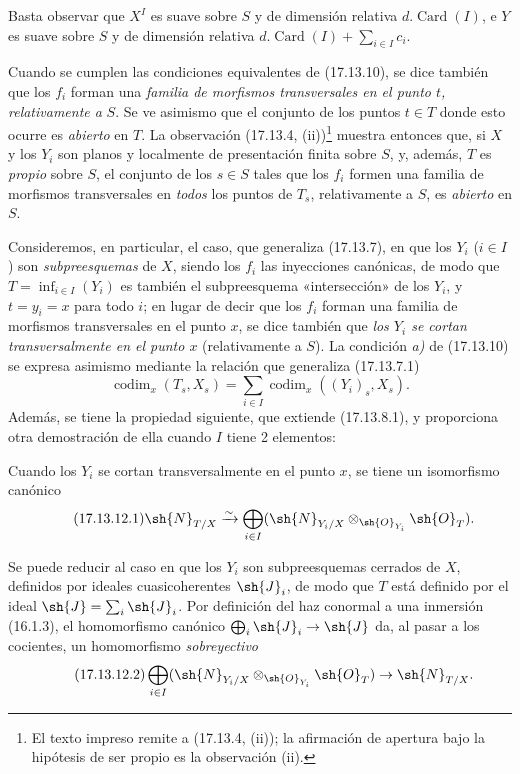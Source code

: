 Basta observar que $X^I$ es suave sobre $S$ y de dimensión relativa $d.\operatorname{Card}(I)$, e $Y$ es suave sobre $S$ y de dimensión relativa $d.\operatorname{Card}(I)+\sum_{i\in I}c_i$.

Cuando se cumplen las condiciones equivalentes de (17.13.10), se dice también que los $f_i$ forman una \emph{familia de morfismos transversales en el punto $t$, relativamente a} $S$. Se ve asimismo que el conjunto de los puntos $t\in T$ donde esto ocurre es \emph{abierto} en $T$. La observación (17.13.4, (ii))\footnote{El texto impreso remite a (17.13.4, (ii)); la afirmación de apertura bajo la hipótesis de ser propio es la observación (ii).} muestra entonces que, si $X$ y los $Y_i$ son planos y localmente de presentación finita sobre $S$, y, además, $T$ es \emph{propio} sobre $S$, el conjunto de los $s\in S$ tales que los $f_i$ formen una familia de morfismos transversales en \emph{todos} los puntos de $T_s$, relativamente a $S$, es \emph{abierto} en $S$.

\begin{env}[17.13.11]
\label{IV.17.13.11}
Consideremos, en particular, el caso, que generaliza (17.13.7), en que los $Y_i$ ($i\in I$) son \emph{subpreesquemas} de $X$, siendo los $f_i$ las inyecciones canónicas, de modo que $T=\inf_{i\in I}(Y_i)$ es también el subpreesquema «intersección» de los $Y_i$, y $t=y_i=x$ para todo $i$; en lugar de decir que los $f_i$ forman una familia de morfismos transversales en el punto $x$, se dice también que \emph{los $Y_i$ se cortan transversalmente en el punto $x$} (relativamente a $S$). La condición \emph{a)} de (17.13.10) se expresa asimismo mediante la relación que generaliza (17.13.7.1)
\[
\label{IV.17.13.11.1}
\tag{17.13.11.1}
\operatorname{codim}_x(T_s,X_s)=\sum_{i\in I}\operatorname{codim}_x((Y_i)_s,X_s).
\]
Además, se tiene la propiedad siguiente, que extiende (17.13.8.1), y proporciona otra demostración de ella cuando $I$ tiene 2 elementos:
\end{env}

\begin{corollary}[17.13.12]
\label{IV.17.13.12}
Cuando los $Y_i$ se cortan transversalmente en el punto $x$, se tiene un isomorfismo canónico
\[
\label{IV.17.13.12.1}
\tag{17.13.12.1}
\sh{N}_{T/X}\xrightarrow{\sim}\bigoplus_{i\in I}(\sh{N}_{Y_i/X}\otimes_{\sh{O}_{Y_i}}\sh{O}_T).
\]
\end{corollary}

Se puede reducir al caso en que los $Y_i$ son subpreesquemas cerrados de $X$, definidos por ideales cuasicoherentes $\sh{J}_i$, de modo que $T$ está definido por el ideal $\sh{J}=\sum_i\sh{J}_i$. Por definición del haz conormal a una inmersión (16.1.3), el homomorfismo canónico $\bigoplus_i\sh{J}_i\to\sh{J}$ da, al pasar a los cocientes, un homomorfismo \emph{sobreyectivo}
\[
\label{IV.17.13.12.2}
\tag{17.13.12.2}
\bigoplus_{i\in I}(\sh{N}_{Y_i/X}\otimes_{\sh{O}_{Y_i}}\sh{O}_T)\to\sh{N}_{T/X}.
\]

